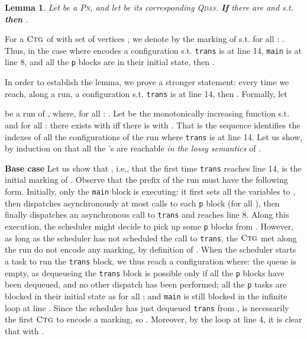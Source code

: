 \documentclass[runningheads,oribibl,]{article}
\newcommand{\pn}{\textsc{Pn}\xspace}
\newcommand{\qdas}{\textsc{Qdas}\xspace}
\newcommand{\ctg}{\ensuremath{\textsc{Ctg}}\xspace}
\newtheorem{lemma}{Lemma}{}
\newenvironment{proof}{\noindent{\it Proof.\hspace*{.5cm}}}{}
\begin{document}
\begin{lemma}
  Let  be a \pn, and let  be its corresponding \qdas.
  \textbf{If} there are  and 
  s.t.  \textbf{then} .
\end{lemma}
\begin{proof}
  For a \ctg  of  with set of vertices , we denote by
   the marking of  s.t. for all : . Thus, in the case where  encodes a
  configuration s.t. \texttt{trans} is at line 14, \texttt{main} is at
  line 8, and all the \texttt{p} blocks are in their initial state,
  then .

  In order to establish the lemma, we prove a stronger statement:
  every time we reach, along a run, a configuration 
  s.t. \texttt{trans} is at line 14, then .
  Formally, let
  
  be a run of , where, for all :
  . Let
   be the monotonically
  increasing function s.t.  and for all :
  there exists  with  iff
  there is  with .  That is the
  sequence  identifies the indexes of
  all the configurations of the run where \texttt{trans} is at line
  14. Let us show, by induction on  that all the 's
  are reachable \emph{in the lossy semantics} of .

  \textbf{Base case } Let us show that , i.e.,
  that the first time \texttt{trans} reaches line 14, 
  is the initial marking of . Observe that the prefix of the run
  must have the following form. Initially, only the \texttt{main} block
  is executing: it first sets all the variables  to , then
  dispatches asynchronously at most  calls to each \texttt{p}
  block (for all ), then finally dispatches an asynchronous
  call to \texttt{trans} and reaches line 8. Along this execution, the
  scheduler might decide to pick up some \texttt{p} blocks from
  . However, as long as the scheduler has not scheduled the call to
  \texttt{trans}, the \ctg met along the run do not encode any
  marking, by definition of . When the scheduler starts a task
  to run the \texttt{trans} block, we thus reach a configuration
   where:  the queue  is empty, as dequeueing the
  \texttt{trans} block is possible only if all the \texttt{p} blocks
  have been dequeued, and no other dispatch has been performed; 
  all the \texttt{p} tasks are blocked in their initial state as
   for all ; and  \texttt{main} is still
  blocked in the infinite loop at line . Since the scheduler has
  just dequeued \texttt{trans} from ,  is necessarily the first
  \ctg to encode a marking, so . Moreover, by the loop
  at line 4, it is clear that  with .


\end{proof}
\end{document}
